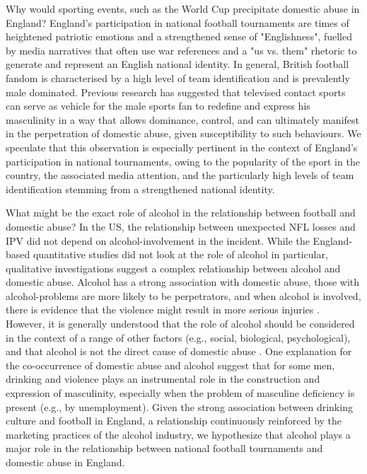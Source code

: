 \documentclass[12pt, letterpaper]{article}
\begin{document}
Why would sporting events, such as the World Cup precipitate domestic abuse in England?   England's participation in national football tournaments are times of heightened patriotic emotions and a strengthened sense of "Englishness", fuelled by media narratives that often use war references and a "us vs. them" rhetoric to generate and represent an English national identity\autocite{Vincent2014}. In general, British football fandom is characterised by a high level of team identification and is prevalently male dominated\autocite{Parry2014}. Previous research has suggested that televised contact sports can serve as vehicle for the male sports fan to redefine and express his masculinity in a way that allows dominance, control, and can ultimately manifest in the perpetration of domestic abuse, given susceptibility to such behaviours\autocite{Sabo}. We speculate that this observation is especially pertinent in the context of England's participation in national tournaments, owing to the popularity of the sport in the country, the associated media attention, and the particularly high levels of team identification stemming from a strengthened national identity. 


What might be the exact role of alcohol in the relationship between football and domestic abuse? In the US, the relationship between unexpected NFL losses and IPV did not depend on alcohol-involvement in the incident\autocite{Card2011}. While the England-based quantitative studies did not look at the role of alcohol in particular, qualitative investigations suggest a complex relationship between alcohol and domestic abuse. Alcohol has a strong association with domestic abuse, those with alcohol-problems are more likely to be perpetrators, and when alcohol is involved, there is evidence that the violence might result in more serious injuries \autocite{Peralta2010}. However, it is generally understood that the role of alcohol should be considered in the context of a range of other factors (e.g., social, biological, psychological), and that alcohol is not the direct cause of domestic abuse \autocite{Javaid2015,Peralta2010}. One explanation for the co-occurrence of domestic abuse and alcohol suggest that for some men, drinking and violence plays an instrumental role in the construction and expression of masculinity, especially when the problem of masculine deficiency is present (e.g., by unemployment)\autocite{Peralta2010}. Given the strong association between drinking culture and football in England\autocite{Dixon2014}, a relationship continuously reinforced by the marketing practices of the alcohol industry\autocite{Gornall2014}, we hypothesize that alcohol plays a major role in the relationship between national football tournaments and domestic abuse in England. 
\end{document}
